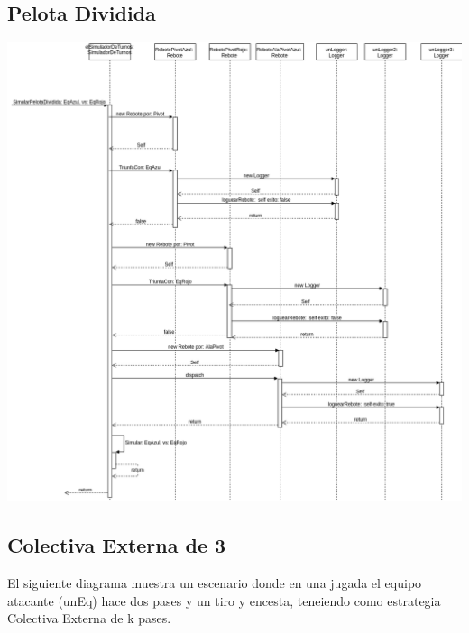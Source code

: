 \subsection{Pelota Dividida}
\includegraphics[width=\textwidth]{imgs/PelotaDivididaSecuencia.png}

\subsection{Colectiva Externa de 3}

El siguiente diagrama muestra un escenario donde en una jugada el equipo atacante (unEq) hace dos pases y un tiro y encesta, teneiendo como estrategia Colectiva Externa de k pases.

